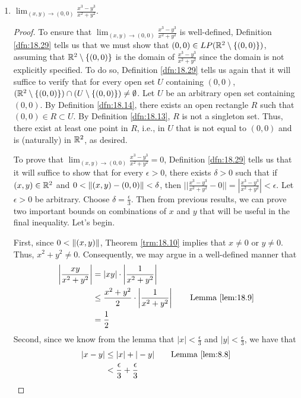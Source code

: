 \documentclass[../main.tex]{subfiles}
\begin{document}
\begin{exercise}
\begin{enumerate}[label={(\alph*)},ref={\theexercise\alph*}]
        \item \label{exr:18.30b}$\lim_{(x,y)\to(0,0)}\frac{x^3-y^3}{x^2+y^2}$.
        \begin{proof}
            To ensure that $\lim_{(x,y)\to(0,0)}\frac{x^3-y^3}{x^2+y^2}$ is well-defined, Definition \ref{dfn:18.29} tells us that we must show that $(0,0)\in LP(\mathbb{R}^2\setminus\{(0,0)\})$, assuming that $\mathbb{R}^2\setminus\{(0,0)\}$ is the domain of $\frac{x^3-y^3}{x^2+y^2}$ since the domain is not explicitly specified. To do so, Definition \ref{dfn:18.29} tells us again that it will suffice to verify that for every open set $U$ containing $(0,0)$, $(\mathbb{R}^2\setminus\{(0,0)\})\cap(U\setminus\{(0,0)\})\neq\emptyset$. Let $U$ be an arbitrary open set containing $(0,0)$. By Definition \ref{dfn:18.14}, there exists an open rectangle $R$ such that $(0,0)\in R\subset U$. By Definition \ref{dfn:18.13}, $R$ is not a singleton set. Thus, there exist at least one point in $R$, i.e., in $U$ that is not equal to $(0,0)$ and is (naturally) in $\mathbb{R}^2$, as desired.\par
            To prove that $\lim_{(x,y)\to(0,0)}\frac{x^3-y^3}{x^2+y^2}=0$, Definition \ref{dfn:18.29} tells us that it will suffice to show that for every $\epsilon>0$, there exists $\delta>0$ such that if $(x,y)\in\mathbb{R}^2$ and $0<\norm{(x,y)-(0,0)}<\delta$, then $||\frac{x^3-y^3}{x^2+y^2}-0||=|\frac{x^3-y^3}{x^2+y^2}|<\epsilon$. Let $\epsilon>0$ be arbitrary. Choose $\delta=\frac{\epsilon}{3}$. Then from previous results, we can prove two important bounds on combinations of $x$ and $y$ that will be useful in the final inequality. Let's begin.\par
            First, since $0<\norm{(x,y)}$, Theorem \ref{trm:18.10} implies that $x\neq 0$ or $y\neq 0$. Thus, $x^2+y^2\neq 0$. Consequently, we may argue in a well-defined manner that
            \begin{align*}
                \left| \frac{xy}{x^2+y^2} \right| &= |xy|\cdot\left| \frac{1}{x^2+y^2} \right|\\
                &\leq \frac{x^2+y^2}{2}\cdot\left| \frac{1}{x^2+y^2} \right|\tag*{Lemma \ref{lem:18.9}}\\
                &= \frac{1}{2}
            \end{align*}
            Second, since we know from the lemma that $|x|<\frac{\epsilon}{3}$ and $|y|<\frac{\epsilon}{3}$, we have that
            \begin{align*}
                |x-y| &\leq |x|+|-y|\tag*{Lemma \ref{lem:8.8}}\\
                &< \frac{\epsilon}{3}+\frac{\epsilon}{3}\\

\end{align*}
\end{proof}
\end{enumerate}
\end{exercise}
\end{document}
